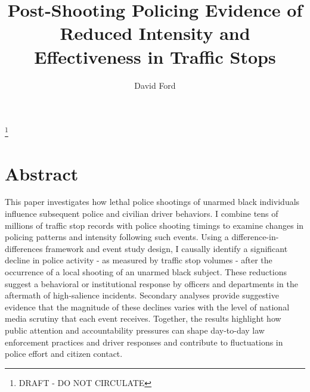 \documentclass[12pt,a4paper]{article}
\begin{document}
\title{Post-Shooting Policing Evidence of Reduced Intensity and Effectiveness in Traffic Stops}
\author{David Ford}
\maketitle
\footnote{DRAFT - DO NOT CIRCULATE} \\

\section{Abstract}
This paper investigates how lethal police shootings of unarmed black individuals influence subsequent police and civilian driver behaviors. I combine tens of millions of traffic stop records with police shooting timings to examine changes in policing patterns and intensity following such events. Using a difference-in-differences framework and event study design, I causally identify a significant decline in police activity - as measured by traffic stop volumes - after the occurrence of a local shooting of an unarmed black subject. These reductions suggest a behavioral or institutional response by officers and departments in the aftermath of high-salience incidents. Secondary analyses provide suggestive evidence that the magnitude of these declines varies with the level of national media scrutiny that each event receives. Together, the results highlight how public attention and accountability pressures can shape day-to-day law enforcement practices and driver responses and contribute to fluctuations in police effort and citizen contact. 


\graphicspath{{C:/Users/david/coding/02_TRAFFIC_BIAS_paper/6000_LaTeX/figures/}}
\end{document}
